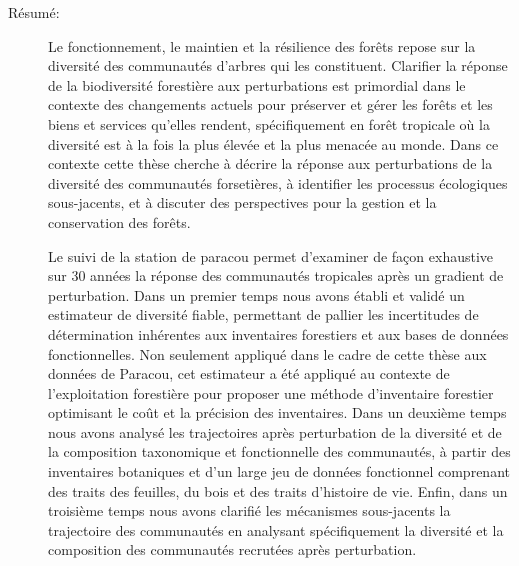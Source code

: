 \documentclass[
  11pt,
  french,
  A4paper,
  extrafontsizes,onecolumn,openright
  ]{memoir}
\begin{document}
\begin{normalsize}

\begin{description}

\item[Résumé:]
Le fonctionnement, le maintien et la résilience des forêts repose sur la
diversité des communautés d'arbres qui les constituent. Clarifier la
réponse de la biodiversité forestière aux perturbations est primordial
dans le contexte des changements actuels pour préserver et gérer les
forêts et les biens et services qu'elles rendent, spécifiquement en
forêt tropicale où la diversité est à la fois la plus élevée et la plus
menacée au monde. Dans ce contexte cette thèse cherche à décrire la
réponse aux perturbations de la diversité des communautés forsetières, à
identifier les processus écologiques sous-jacents, et à discuter des
perspectives pour la gestion et la conservation des forêts.

Le suivi de la station de paracou permet d'examiner de façon exhaustive
sur 30 années la réponse des communautés tropicales après un gradient de
perturbation. Dans un premier temps nous avons établi et validé un
estimateur de diversité fiable, permettant de pallier les incertitudes
de détermination inhérentes aux inventaires forestiers et aux bases de
données fonctionnelles. Non seulement appliqué dans le cadre de cette
thèse aux données de Paracou, cet estimateur a été appliqué au contexte
de l'exploitation forestière pour proposer une méthode d'inventaire
forestier optimisant le coût et la précision des inventaires. Dans un
deuxième temps nous avons analysé les trajectoires après perturbation de
la diversité et de la composition taxonomique et fonctionnelle des
communautés, à partir des inventaires botaniques et d'un large jeu de
données fonctionnel comprenant des traits des feuilles, du bois et des
traits d'histoire de vie. Enfin, dans un troisième temps nous avons
clarifié les mécanismes sous-jacents la trajectoire des communautés en
analysant spécifiquement la diversité et la composition des communautés
recrutées après perturbation.


\end{description}
\end{normalsize}
\end{document}
